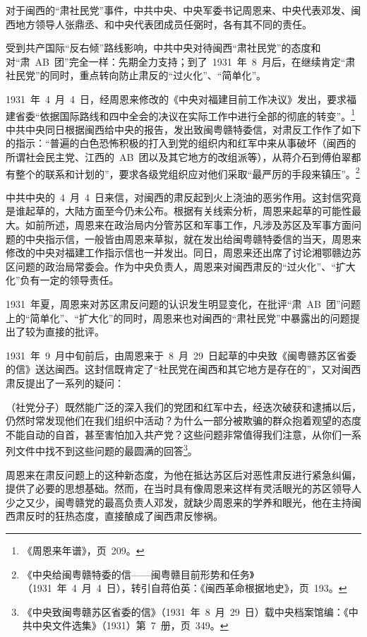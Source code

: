 对于闽西的“肃社民党”事件，中共中央、中央军委书记周恩来、中央代表邓发、闽西地方领导人张鼎丞、和中央代表团成员任弼时，各有其不同的责任。

受到共产国际“反右倾”路线影响，中共中央对待闽西“肃社民党”的态度和对“肃~AB~团”完全一样：先期全力支持；到了~1931~年~8~月后，在继续肯定“肃社民党”的同时，重点转向防止肃反的“过火化”、“简单化”。

1931~年~4~月~4~日，经周恩来修改的《中央对福建目前工作决议》发出，要求福建省委“依据国际路线和四中全会的决议在实际工作中进行全部的彻底的转变”。\footnote{《周恩来年谱》，页~209。}中共中央同日根据闽西给中央的报告，发出致闽粤赣特委信，对肃反工作作了如下的指示：“普遍的白色恐怖积极的打入到党的组织内和红军中来从事破坏（闽西的所谓社会民主党、江西的~AB~团以及其它地方的改组派等），从蒋介石到傅伯翠都有整个的联系和计划的”，要求各级党组织应对他们采取“最严厉的手段来镇压”。\footnote{《中央给闽粤赣特委的信——闽粤赣目前形势和任务》（1931~年~4~月~4~日），转引自蒋伯英：《闽西革命根据地史》，页~193。}

中共中央的~4~月~4~日来信，对闽西的肃反起到火上浇油的恶劣作用。这封信究竟是谁起草的，大陆方面至今仍未公布。根据有关线索分析，周恩来起草的可能性最大。如前所述，周恩来在政治局内分管苏区和军事工作，凡涉及苏区及军事方面问题的中央指示信，一般皆由周恩来草拟，就在发出给闽粤赣特委信的当天，周恩来修改的中央对福建工作指示信也一并发出。同日，周恩来还出席了讨论湘鄂赣边苏区问题的政治局常委会。作为中央负责人，周恩来对闽西肃反的“过火化”、“扩大化”负有一定的领导责任。

1931~年夏，周恩来对苏区肃反问题的认识发生明显变化，在批评“肃~AB~团”问题上的“简单化”、“扩大化”的同时，周恩来也对闽西的“肃社民党”中暴露出的问题提出了较为直接的批评。

1931~年~9~月中旬前后，由周恩来于~8~月~29~日起草的中央致《闽粤赣苏区省委的信》送达闽西。这封信既肯定了“社民党在闽西和其它地方是存在的”，又对闽西肃反提出了一系列的疑问：

\begin{quoting}
（社党分子）既然能广泛的深入我们的党团和红军中去，经迭次破获和逮捕以后，仍然时常发现他们在我们组织中活动？为什么一部分被欺骗的群众抱着观望的态度不能自动的自首，甚至害怕加入共产党？这些问题非常值得我们注意，从你们一系列文件中找不到这些问题的最圆满的回答\footnote{《中央致闽粤赣苏区省委的信》（1931~年~8~月~29~日）载中央档案馆编：《中共中央文件选集》（1931）第~7~册，页~349。}。
\end{quoting}

周恩来在肃反问题上的这种新态度，为他在抵达苏区后对恶性肃反进行紧急纠偏，提供了必要的思想基础。然而，在当时具有像周恩来这样有灵活眼光的苏区领导人少之又少，闽粤赣党的最高负责人邓发，就缺少周恩来的学养和眼光，他在主持闽西肃反时的狂热态度，直接酿成了闽西肃反惨祸。

